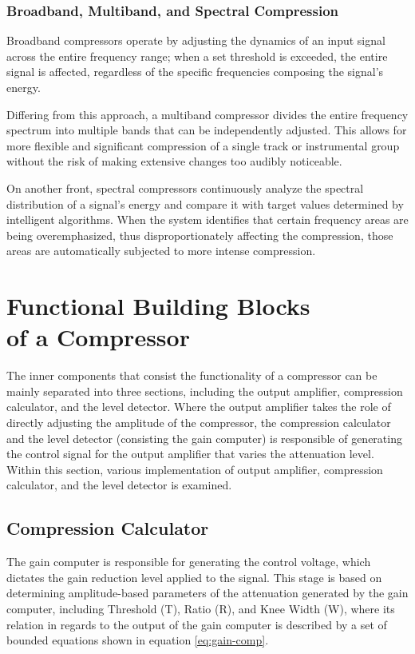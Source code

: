 \documentclass[10pt]{article}
\begin{document}
\begin{multicols*}{2}
                \subsubsection{Broadband, Multiband, and Spectral Compression}
                    Broadband compressors operate by adjusting the dynamics of an input signal across the entire frequency range; when a set threshold is exceeded, the entire signal is affected, regardless of the specific frequencies composing the signal's energy.\par
                    Differing from this approach, a multiband compressor divides the entire frequency spectrum into multiple bands that can be independently adjusted. This allows for more flexible and significant compression of a single track or instrumental group without the risk of making extensive changes too audibly noticeable. \par
                    On another front, spectral compressors continuously analyze the spectral distribution of a signal's energy and compare it with target values determined by intelligent algorithms. When the system identifies that certain frequency areas are being overemphasized, thus disproportionately affecting the compression, those areas are automatically subjected to more intense compression.

        \section[Functional Building Blocks of a Compressor]{Functional Building Blocks\\of a Compressor}
            The inner components that consist the functionality of a compressor can be mainly separated into three sections, including the output amplifier, compression calculator, and the level detector. Where the output amplifier takes the role of directly adjusting the amplitude of the compressor, the compression calculator and the level detector (consisting the gain computer) is responsible of generating the control signal for the output amplifier that varies the attenuation level. Within this section, various implementation of output amplifier, compression calculator, and the level detector is examined.

            \subsection{Compression Calculator}
                The gain computer is responsible for generating the control voltage, which dictates the gain reduction level applied to the signal. This stage is based on determining amplitude-based parameters of the attenuation generated by the gain computer, including Threshold (T), Ratio (R), and Knee Width (W), where its relation in regards to the output of the gain computer is described by a set of bounded equations shown in equation \ref{eq:gain-comp}.


\end{multicols*}
\end{document}
